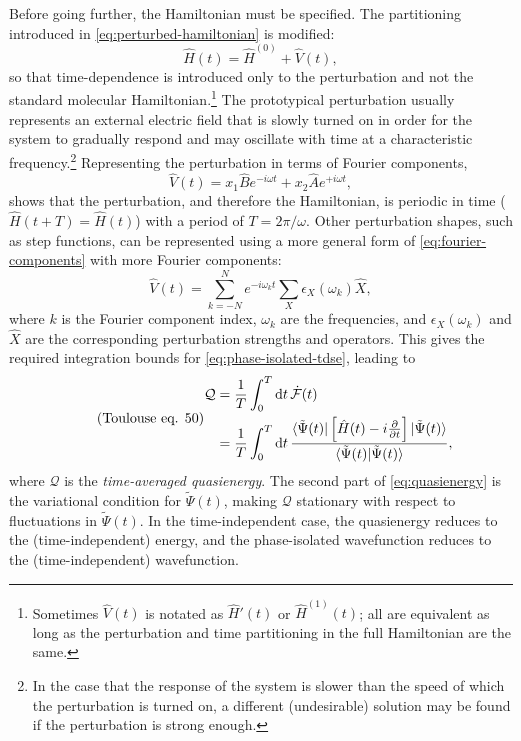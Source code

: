 \documentclass[%
class = book,%
crop = false,%
float = true,%
multi = true,%
preview = false,%
]{standalone}
\begin{document}
Before going further, the Hamiltonian must be specified. The partitioning introduced in \eqref{eq:perturbed-hamiltonian} is modified:
\begin{equation}
  \label{eq:perturbed-hamiltonian-time-dependent}
  \hat{H}(t) = \hat{H}^{(0)} + \hat{V}(t),
\end{equation}
so that time-dependence is introduced only to the perturbation and not the standard molecular Hamiltonian.\footnote{Sometimes \(\hat{V}(t)\) is notated as \(\hat{H}'(t)\) or \(\hat{H}^{(1)}(t)\); all are equivalent as long as the perturbation and time partitioning in the full Hamiltonian are the same.} The prototypical perturbation usually represents an external electric field that is slowly turned on in order for the system to gradually respond and may oscillate with time at a characteristic frequency.\footnote{In the case that the response of the system is slower than the speed of which the perturbation is turned on, a different (undesirable) solution may be found if the perturbation is strong enough.} Representing the perturbation in terms of Fourier components,
\begin{equation}
  \label{eq:fourier-components} \tag{Toulouse eq. 46 [modified]}
  \hat{V}(t) = x_{1} \hat{B} e^{-i\omega t} + x_{2} \hat{A} e^{+i\omega t},
\end{equation} %
shows that the perturbation, and therefore the Hamiltonian, is periodic in time (\(\hat{H}(t + T) = \hat{H}(t)\)) with a period of \(T = 2\pi/\omega\). Other perturbation shapes, such as step functions, can be represented using a more general form of \eqref{eq:fourier-components} with more Fourier components:
\begin{equation}
  \label{eq:general-fourier-components-gauss-106}\tag{Gauss eq. 106}
  \hat{V}(t) = \sum_{k=-N}^{N} e^{-i\omega_{k}t} \sum_{X} \epsilon_{X}(\omega_{k})\hat{X},
\end{equation}
where \(k\) is the Fourier component index, \(\omega_{k}\) are the frequencies, and \(\epsilon_{X}(\omega_{k})\) and \(\hat{X}\) are the corresponding perturbation strengths and operators. This gives the required integration bounds for \eqref{eq:phase-isolated-tdse}, leading to
\begin{equation}
  \label{eq:quasienergy} \tag{Toulouse eq. 50}
  \begin{aligned}
    \mathcal{Q} &= \frac{1}{T} \int_{0}^{T} \mathrm{d}t \, \dot{\mathcal{F}}(t) \\
    &= \frac{1}{T} \int_{0}^{T} \mathrm{d}t \, \frac{\bra{\tilde{\Psi}(t)} \left[ \hat{H}(t) - i\frac{\partial}{\partial t} \right] \ket{\tilde{\Psi}(t)}}{\braket{\tilde{\Psi}(t)|\tilde{\Psi}(t)}},
  \end{aligned}
\end{equation}
where \(\mathcal{Q}\) is the \emph{time-averaged quasienergy}. The second part of \eqref{eq:quasienergy} is the variational condition for \(\tilde{\Psi}(t)\), making \(\mathcal{Q}\) stationary with respect to fluctuations in \(\tilde{\Psi}(t)\). In the time-independent case, the quasienergy reduces to the (time-independent) energy, and the phase-isolated wavefunction reduces to the (time-independent) wavefunction.
\end{document}
